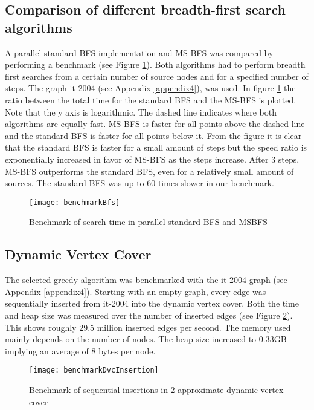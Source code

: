 \subsection{Comparison of different breadth-first search algorithms} \label{bench:msbfs}
A parallel standard BFS implementation and MS-BFS was compared by performing a benchmark (see Figure \ref{fig:benchmarkbfs}). Both algorithms had to perform breadth first searches from a certain number of source nodes and for a specified number of steps. The graph it-2004 (see Appendix \ref{appendix4}), was used. In figure \ref{fig:benchmarkbfs} the ratio between the total time for the standard BFS and the MS-BFS is plotted. Note that the y axis is logarithmic. The dashed line indicates where both algorithms are equally fast. MS-BFS is faster for all points above the dashed line and the standard BFS is faster for all points below it. From the figure it is clear that the standard BFS is faster for a small amount of steps but the speed ratio is exponentially increased in favor of MS-BFS as the steps increase. After $3$ steps, MS-BFS outperforms the standard BFS, even for a relatively small amount of sources. The standard BFS was up to $60$ times slower in our benchmark.

\begin{figure}[h]
\centering
\texttt{[image: benchmarkBfs]}    
\captionsetup{justification=centering}
\caption {Benchmark of search time in parallel standard BFS and MSBFS}
\label{fig:benchmarkbfs}
\end{figure}
\fi

\subsection{Dynamic Vertex Cover} \label{bench:dvc}
The selected greedy algorithm was benchmarked with the it-2004 graph (see Appendix \ref{appendix4}). Starting with an empty graph, every edge was sequentially inserted from it-2004 into the dynamic vertex cover. Both the time and heap size was measured over the number of inserted edges (see Figure \ref{fig:benchmarkDvcInsertion}). This shows roughly 29.5 million inserted edges per second. The memory used mainly depends on the number of nodes. The heap size increased to 0.33GB implying an average of 8 bytes per node. 

\begin{figure}[h]
\centering
\texttt{[image: benchmarkDvcInsertion]}    
\captionsetup{justification=centering}
\caption {Benchmark of sequential insertions in 2-approximate dynamic vertex cover}
\label{fig:benchmarkDvcInsertion}
\end{figure}


